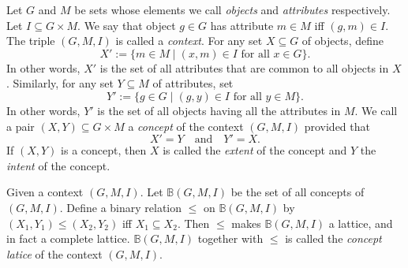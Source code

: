 \documentclass[12pt]{article}
\begin{document}
Let $G$ and $M$ be sets whose elements we call \emph{objects} and \emph{attributes} respectively.  Let $I\subseteq G\times M$.  We say that object $g\in G$ has attribute $m\in M$ iff $(g,m)\in I$.  The triple $(G,M,I)$ is called a \emph{context}.  For any set $X\subseteq G$ of objects, define $$X':=\lbrace m\in M\mid (x,m)\in I \textrm{ for all }x\in G\rbrace.$$  In other words, $X'$ is the set of all attributes that are common to all objects in $X$.  Similarly, for any set $Y\subseteq M$ of attributes, set $$Y':=\lbrace g\in G\mid (g,y)\in I \textrm{ for all }y\in M\rbrace.$$  In other words, $Y'$ is the set of all objects having all the attributes in $M$.  We call a pair $(X,Y)\subseteq G\times M$ a \emph{concept} of the context $(G,M,I)$ provided that $$X'=Y \quad \textrm{and} \quad Y'=X.$$  If $(X,Y)$ is a concept, then $X$ is called the \emph{extent} of the concept and $Y$ the \emph{intent} of the concept.

Given a context $(G,M,I)$.  Let $\mathbb{B}(G,M,I)$ be the set of all concepts of $(G,M,I)$.  Define a binary relation $\le$ on $\mathbb{B}(G,M,I)$ by $(X_1,Y_1)\le (X_2,Y_2)$ iff $X_1\subseteq X_2$.  Then $\le$ makes $\mathbb{B}(G,M,I)$ a lattice, and in fact a complete lattice.  $\mathbb{B}(G,M,I)$ together with $\le$ is called the \emph{concept latice} of the context $(G,M,I)$.

\end{document}

